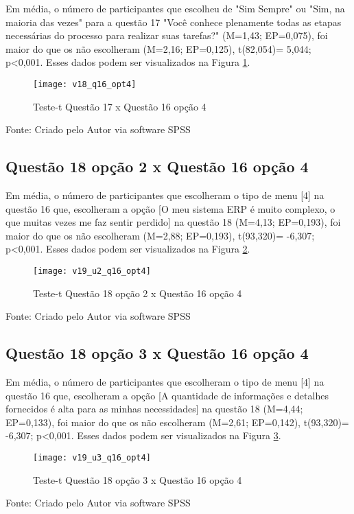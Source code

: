 Em média, o número de participantes que escolheu de  "Sim Sempre" ou "Sim, na maioria das vezes" para a questão 17 "Você conhece plenamente todas as etapas necessárias do processo para realizar suas tarefas?" (M=1,43; EP=0,075), foi maior do que os não escolheram (M=2,16; EP=0,125), t(82,054)= 5,044; p<0,001. Esses dados podem ser visualizados na Figura \ref{fig:figura-v18_q16_opt4}.
\begin{figure}[H]
	\centering	
	\caption{Teste-t Questão 17 x Questão 16 opção 4}
	\texttt{[image: v18\_q16\_opt4]}
	\label{fig:figura-v18_q16_opt4}
\end{figure}
\vspace{-0.8 cm} \hspace{1.55 cm} Fonte: Criado pelo Autor via software SPSS

\subsection{Questão 18 opção 2 x Questão 16 opção 4}

Em média, o número de participantes que escolheram o tipo de menu [4] na questão 16 que, escolheram a opção [O meu sistema ERP é muito complexo, o que muitas vezes me faz sentir perdido] na questão 18 (M=4,13; EP=0,193), foi maior do que os não escolheram (M=2,88; EP=0,193),  t(93,320)= -6,307; p<0,001. Esses dados podem ser visualizados na Figura \ref{fig:figura-v19_u2_q16_opt4}.
\begin{figure}[H]
	\centering	
	\caption{Teste-t Questão 18 opção 2 x Questão 16 opção 4}
	\texttt{[image: v19\_u2\_q16\_opt4]}
	\label{fig:figura-v19_u2_q16_opt4}
\end{figure}
\vspace{-0.8 cm} \hspace{1.55 cm} Fonte: Criado pelo Autor via software SPSS

\subsection{Questão 18 opção 3 x Questão 16 opção 4}

Em média, o número de participantes que escolheram o tipo de menu [4] na questão 16 que, escolheram a opção [A quantidade de informações e detalhes fornecidos é alta para as minhas necessidades]  na questão 18 (M=4,44; EP=0,133), foi maior do que os não escolheram (M=2,61; EP=0,142), t(93,320)= -6,307; p<0,001. Esses dados podem ser visualizados na Figura \ref{fig:figura-v19_u3_q16_opt4}.
\begin{figure}[H]
	\centering	
	\caption{Teste-t Questão 18 opção 3 x Questão 16 opção 4}
	\texttt{[image: v19\_u3\_q16\_opt4]}
	\label{fig:figura-v19_u3_q16_opt4}
\end{figure}
\vspace{-0.8 cm} \hspace{1.55 cm} Fonte: Criado pelo Autor via software SPSS


